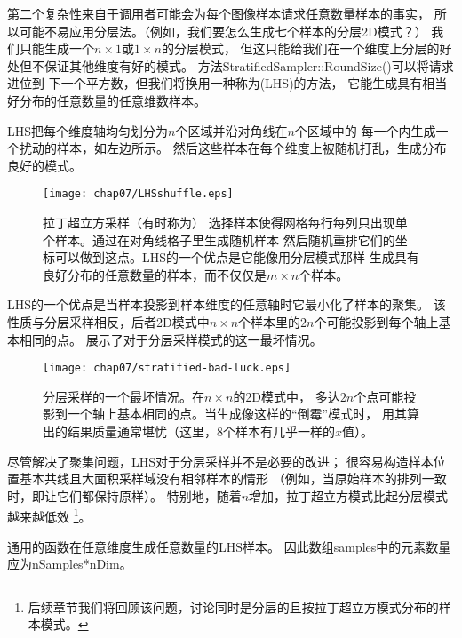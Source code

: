 第二个复杂性来自于调用者可能会为每个图像样本请求任意数量样本的事实，
所以可能不易应用分层法。（例如，我们要怎么生成七个样本的分层2D模式？）
我们只能生成一个$n\times1$或$1\times n$的分层模式，
但这只能给我们在一个维度上分层的好处但不保证其他维度有好的模式。
方法{\ttfamily StratifiedSampler::RoundSize()}可以将请求进位到
下一个平方数，但我们将换用一种称为(LHS)的方法，
它能生成具有相当好分布的任意数量的任意维数样本。

LHS把每个维度轴均匀划分为$n$个区域并沿对角线在$n$个区域中的
每一个内生成一个扰动的样本，如左边所示。
然后这些样本在每个维度上被随机打乱，生成分布良好的模式。
\begin{figure}[htbp]
    \centering\texttt{[image: chap07/LHSshuffle.eps]}
    \caption{拉丁超立方采样（有时称为\protect{}）
        选择样本使得网格每行每列只出现单个样本。通过在对角线格子里生成随机样本
        然后随机重排它们的坐标可以做到这点。LHS的一个优点是它能像用分层模式那样
        生成具有良好分布的任意数量的样本，而不仅仅是$m\times n$个样本。}
    \label{fig:7.20}
\end{figure}

LHS的一个优点是当样本投影到样本维度的任意轴时它最小化了样本的聚集。
该性质与分层采样相反，后者2D模式中$n\times n$个样本里的$2n$个可能投影到每个轴上基本相同的点。
展示了对于分层采样模式的这一最坏情况。
\begin{figure}[htbp]
    \centering\texttt{[image: chap07/stratified-bad-luck.eps]}
    \caption{分层采样的一个最坏情况。在$n\times n$的2D模式中，
        多达$2n$个点可能投影到一个轴上基本相同的点。当生成像这样的“倒霉”模式时，
        用其算出的结果质量通常堪忧（这里，8个样本有几乎一样的$x$值）。}
    \label{fig:7.21}
\end{figure}

尽管解决了聚集问题，LHS对于分层采样并不是必要的改进；
很容易构造样本位置基本共线且大面积采样域没有相邻样本的情形
（例如，当原始样本的排列一致时，即让它们都保持原样）。
特别地，随着$n$增加，拉丁超立方模式比起分层模式越来越低效
\footnote{后续章节我们将回顾该问题，讨论同时是分层的且按拉丁超立方模式分布的样本模式。}。

通用的函数在任意维度生成任意数量的LHS样本。
因此数组{\ttfamily samples}中的元素数量应为{\ttfamily nSamples*nDim}。

